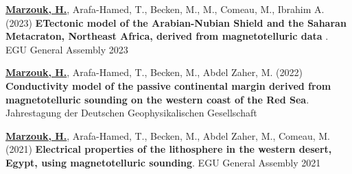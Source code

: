 

\begin{scholarship}
	\emptySeparator

	{\textbf{\underline{Marzouk, H.}}, Arafa-Hamed, T.,  Becken, M.,  M., Comeau, M., Ibrahim A. (2023) \textbf{ETectonic model of the Arabian-Nubian Shield and the Saharan Metacraton, Northeast Africa, derived from magnetotelluric data }. EGU General Assembly 2023	\newline
		\newline}

	{\textbf{\underline{Marzouk, H.}}, Arafa-Hamed, T., Becken, M., Abdel Zaher, M. (2022) \textbf{Conductivity model of the passive continental margin derived from magnetotelluric sounding on the western coast of the Red Sea}. Jahrestagung der Deutschen Geophysikalischen Gesellschaft \newline
		\newline}

	{\textbf{\underline{Marzouk, H.}}, Arafa-Hamed, T.,  Becken, M., Abdel Zaher, M., Comeau, M. (2021) \textbf{Electrical properties of the lithosphere in the western desert, Egypt, using magnetotelluric sounding}. EGU General Assembly 2021	\newline	{}\newline}

\end{scholarship}